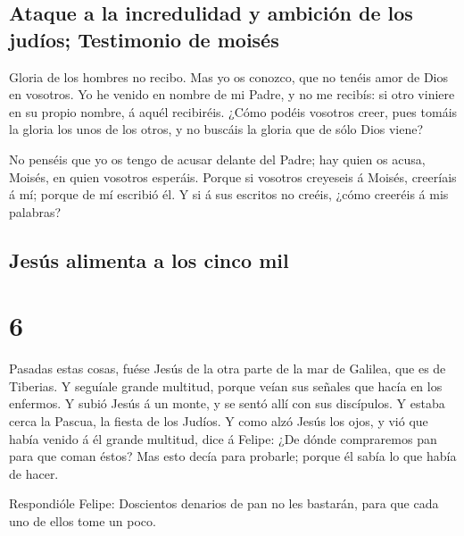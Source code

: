 \hypertarget{ataque-a-la-incredulidad-y-ambiciuxf3n-de-los-juduxedos-testimonio-de-moisuxe9s}{%
\subsection{Ataque a la incredulidad y ambición de los judíos;
Testimonio de
moisés}\label{ataque-a-la-incredulidad-y-ambiciuxf3n-de-los-juduxedos-testimonio-de-moisuxe9s}}

 Gloria de los hombres no recibo.  Mas yo
os conozco, que no tenéis amor de Dios en vosotros.  Yo
he venido en nombre de mi Padre, y no me recibís: si otro viniere en su
propio nombre, á aquél recibiréis.  ¿Cómo podéis vosotros
creer, pues tomáis la gloria los unos de los otros, y no buscáis la
gloria que de sólo Dios viene?

 No penséis que yo os tengo de acusar delante del Padre;
hay quien os acusa, Moisés, en quien vosotros esperáis. 
Porque si vosotros creyeseis á Moisés, creeríais á mí; porque de mí
escribió él.  Y si á sus escritos no creéis, ¿cómo
creeréis á mis palabras?

\hypertarget{jesuxfas-alimenta-a-los-cinco-mil}{%
\subsection{Jesús alimenta a los cinco
mil}\label{jesuxfas-alimenta-a-los-cinco-mil}}

\hypertarget{section-5}{%
\section{6}\label{section-5}}

 Pasadas estas cosas, fuése Jesús de la otra parte de la
mar de Galilea, que es de Tiberias.  Y seguíale grande
multitud, porque veían sus señales que hacía en los enfermos.
 Y subió Jesús á un monte, y se sentó allí con sus
discípulos.  Y estaba cerca la Pascua, la fiesta de los
Judíos.  Y como alzó Jesús los ojos, y vió que había
venido á él grande multitud, dice á Felipe: ¿De dónde compraremos pan
para que coman éstos?  Mas esto decía para probarle;
porque él sabía lo que había de hacer.

 Respondióle Felipe: Doscientos denarios de pan no les
bastarán, para que cada uno de ellos tome un poco.

